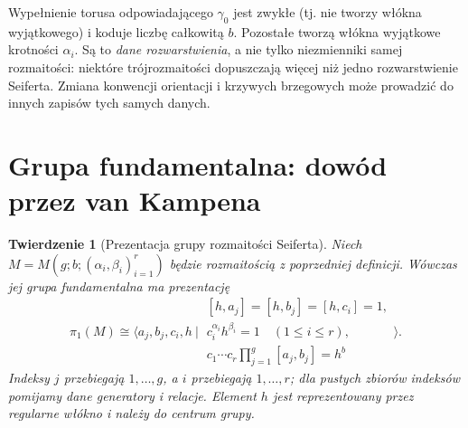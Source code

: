 \documentclass[11pt,a4paper]{report}
\numberwithin{equation}{section}
\theoremstyle{plain}
\newtheorem{twierdzenie}{Twierdzenie}[section]
\theoremstyle{definition}
\theoremstyle{remark}
\begin{document}
Wypełnienie torusa odpowiadającego $\gamma_0$ jest zwykłe
(tj. nie tworzy włókna wyjątkowego) i koduje liczbę
całkowitą $b$. Pozostałe tworzą włókna wyjątkowe
krotności $\alpha_i$. Są to \emph{dane rozwarstwienia},
a nie tylko niezmienniki samej rozmaitości: niektóre
trójrozmaitości dopuszczają więcej niż jedno rozwarstwienie
Seiferta. Zmiana konwencji orientacji i krzywych brzegowych
może prowadzić do innych zapisów tych samych danych.

\begin{center}
\end{center}

\section{Grupa fundamentalna: dowód przez van Kampena}
\label{sec:tg-seifert-pi1}

\begin{twierdzenie}[Prezentacja grupy rozmaitości Seiferta]
\label{thm:tg-seifert-presentation}
Niech $M=M(g;b;(\alpha_i,\beta_i)_{i=1}^r)$ będzie
rozmaitością z poprzedniej definicji. Wówczas jej grupa
fundamentalna ma prezentację
\[
\pi_1(M)\cong\Big\langle a_j,b_j,c_i,h\ \Big|\
\begin{array}{l}
[h,a_j]=[h,b_j]=[h,c_i]=1,\\
c_i^{\alpha_i}h^{\beta_i}=1\quad (1\leq i\leq r),\\
c_1\cdots c_r\prod_{j=1}^g[a_j,b_j]=h^b
\end{array}\Big\rangle.
\]
Indeksy $j$ przebiegają $1,\ldots,g$, a $i$ przebiegają
$1,\ldots,r$; dla pustych zbiorów indeksów pomijamy
dane generatory i relacje. Element $h$ jest reprezentowany
przez regularne włókno i należy do centrum grupy.
\end{twierdzenie}
\end{document}
